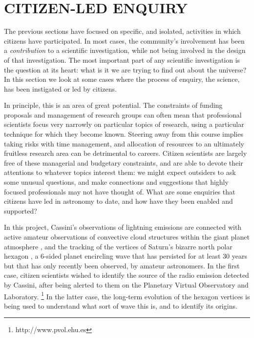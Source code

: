 \documentclass{ar2e}
\begin{document}
% 
% 



\section{CITIZEN-LED ENQUIRY}
\label{sec:explore}

The previous sections have focused on specific, and isolated, activities in
which citizens have participated. In most cases, the community's involvement has
been a {\it contribution} to a scientific investigation, while not being
involved in the design of that investigation. The most important part of any
scientific investigation is the question at its heart: what is it we are trying
to find out about the universe? In this section we look at some cases where the
process of enquiry, the science, has been instigated or led by citizens.  

In principle, this is an area of great potential. The constraints of funding
proposals and management of research groups can often mean that professional
scientists focus very narrowly on particular topics of research, using a
particular technique for which they become known.  Steering away from this
course implies taking risks with time management, and allocation of resources to
an ultimately fruitless research area can be detrimental to careers.  Citizen
scientists are largely free of these managerial and budgetary constraints, and
are able to devote their attentions to whatever topics interest them: we might
expect outsiders to ask some unusual questions, and make connections and
suggestions that highly focused professionals may not have thought of. What are
some enquiries that citizens have led in astronomy to date, and how have they
been enabled and supported?


  In this project, Cassini's observations of
lightning emissions are connected with active amateur observations of
convective cloud structures within the giant planet atmosphere
\citep{Fischer++2011},  and the tracking of the vertices of Saturn's bizarre
north polar hexagon \citep{godfrey88}, a 6-sided planet encircling wave that
has persisted for at least 30 years but that has only recently been observed,
by amateur astronomers.  In the first case, citizen scientists wished to
identify the source of the radio emission detected by Cassini, after being
alerted to them on the Planetary Virtual  Observatory and Laboratory.
\footnote{http://www.pvol.ehu.es} In the latter case, the long-term evolution
of the hexagon vertices is being used to understand what sort of wave this is,
and to identify its origins.
\end{document}
